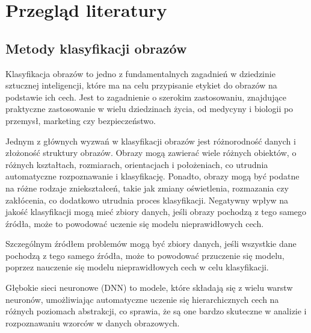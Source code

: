 
\chapter*{Przegląd literatury}
\section*{Metody klasyfikacji obrazów}

Klasyfikacja obrazów to jedno z fundamentalnych zagadnień w dziedzinie sztucznej inteligencji, które ma na celu przypisanie etykiet do obrazów na podstawie ich cech.
Jest to zagadnienie o szerokim zastosowaniu, znajdujące praktyczne zastosowanie w wielu dziedzinach życia, od medycyny i biologii po przemysł, marketing czy bezpieczeństwo.

Jednym z głównych wyzwań w klasyfikacji obrazów jest różnorodność danych i złożoność struktury obrazów.
Obrazy mogą zawierać wiele różnych obiektów, o różnych kształtach, rozmiarach, orientacjach i położeniach, co utrudnia automatyczne rozpoznawanie i klasyfikację.
Ponadto, obrazy mogą być podatne na różne rodzaje zniekształceń, takie jak zmiany oświetlenia, rozmazania czy zakłócenia, co dodatkowo utrudnia proces klasyfikacji.
Negatywny wpływ na jakość klasyfikacji mogą mieć zbiory danych, jeśli obrazy pochodzą z tego samego źródła, może to powodować uczenie się modelu nieprawidłowych cech.

Szczególnym źródłem problemów mogą być zbiory danych, jeśli wszystkie dane pochodzą z tego samego źródła, może to powodować przuczenie się modelu, poprzez nauczenie się modelu nieprawidłowych cech w celu klasyfikacji.

Głębokie sieci neuronowe (DNN) to modele, które składają się z wielu warstw neuronów, umożliwiając automatyczne uczenie się hierarchicznych cech na różnych poziomach abstrakcji, co sprawia, że są one bardzo skuteczne w analizie i rozpoznawaniu wzorców w danych obrazowych.

